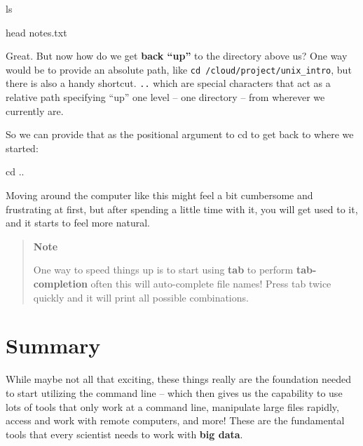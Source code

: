 \documentclass[
]{book}
\newenvironment{Shaded}{\begin{snugshade}}{\end{snugshade}}
\newcommand{\BuiltInTok}[1]{#1}
\newcommand{\FunctionTok}[1]{\textcolor[rgb]{0.00,0.00,0.00}{#1}}
\newcommand{\NormalTok}[1]{#1}
\begin{document}
\begin{Shaded}
\begin{Highlighting}[]
    \FunctionTok{ls}
\end{Highlighting}
\end{Shaded}

\begin{Shaded}
\begin{Highlighting}[]
    \FunctionTok{head}\NormalTok{ notes.txt}
\end{Highlighting}
\end{Shaded}

Great. But now how do we get \textbf{back ``up''} to the directory above us? One way would be to provide an absolute path, like \texttt{cd\ /cloud/project/unix\_intro}, but there is also a handy shortcut. \texttt{..} which are special characters that act as a relative path specifying ``up'' one level -- one directory -- from wherever we currently are.

So we can provide that as the positional argument to cd to get back to where we started:

\begin{Shaded}
\begin{Highlighting}[]
    \BuiltInTok{cd}\NormalTok{ ..}
\end{Highlighting}
\end{Shaded}

Moving around the computer like this might feel a bit cumbersome and frustrating at first, but after spending a little time with it, you will get used to it, and it starts to feel more natural.

\begin{quote}
\textbf{Note}

One way to speed things up is to start using \textbf{tab} to perform \textbf{tab-completion} often this will auto-complete file names! Press tab twice quickly and it will print all possible combinations.
\end{quote}

\hypertarget{summary}{%
\section{Summary}\label{summary}}

While maybe not all that exciting, these things really are the foundation needed to start utilizing the command line -- which then gives us the capability to use lots of tools that only work at a command line, manipulate large files rapidly, access and work with remote computers, and more! These are the fundamental tools that every scientist needs to work with \textbf{big data}.
\end{document}
